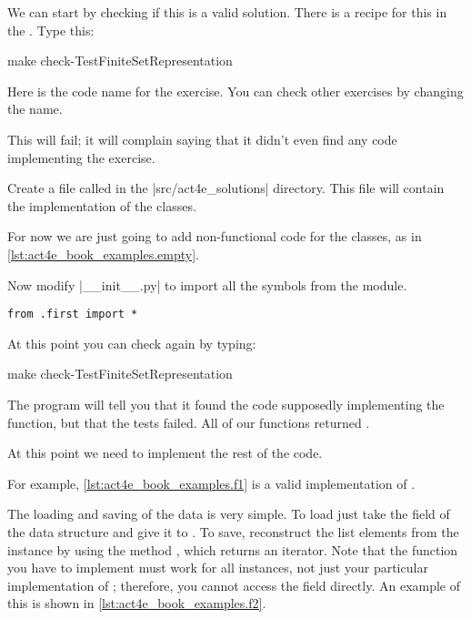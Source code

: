 We can start by checking if this is a valid solution.
There is a recipe for this in the .
Type this:

\begin{console}
    make check-TestFiniteSetRepresentation
\end{console}

Here  is the code name for the exercise. You can check other exercises by changing the name.

This will fail; it will complain saying that it didn't even find any code implementing the exercise.


Create a file called  in the \files|src/act4e_solutions| directory.
This file will contain the implementation of the classes.

For now we are just going to add non-functional code for the classes,
as in \cref{lst:act4e_book_examples.empty}.

\begin{longcode}
    \caption{}
    
    \label{lst:act4e_book_examples.empty}
\end{longcode}

Now modify \files|__init__.py| to import all the symbols from the  module.

\begin{verbatim}
from .first import *
\end{verbatim}

At this point you can check again by typing:

\begin{console}
    make check-TestFiniteSetRepresentation
\end{console}

The program will tell you that it found the code supposedly implementing the function,
but that the tests failed. All of our functions returned .

At this point we need to implement the rest of the code.

For example, \cref{lst:act4e_book_examples.f1} is a valid implementation of \FiniteSet.

\begin{longcode}
    \caption{}
    \label{lst:act4e_book_examples.f1}
\end{longcode}

The loading and saving of the data is very simple.
To load just take the  field of the data structure and give it to .
To save, reconstruct the list elements from the  instance by using the method , which returns an iterator.
Note that the  function you have to implement must work for all \FiniteSet instances, not just your particular implementation of \FiniteSet; therefore, you cannot access the  field directly.
An example of this is shown in \cref{lst:act4e_book_examples.f2}.

